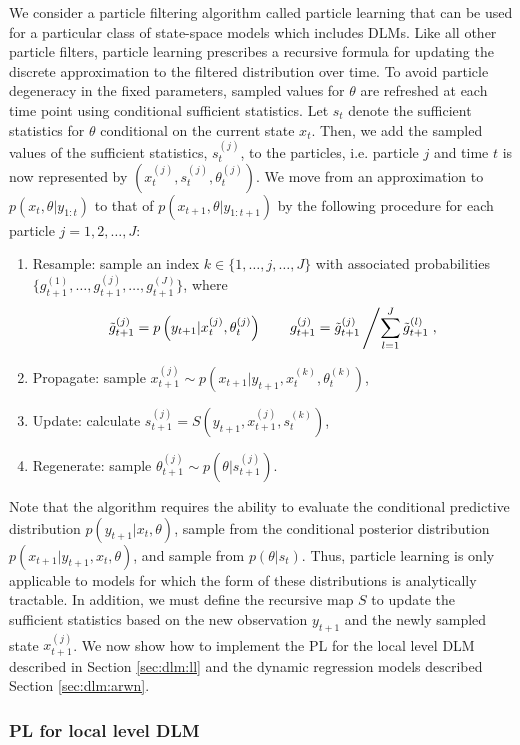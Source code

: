 We consider a particle filtering algorithm called particle learning \citep{Carv:Joha:Lope:Pols:part} that can be used for a particular class of state-space models which includes DLMs. Like all other particle filters, particle learning prescribes a recursive formula for updating the discrete approximation to the filtered distribution over time. To avoid particle degeneracy in the fixed parameters, sampled values for $\theta$ are refreshed at each time point using conditional sufficient statistics. Let $s_t$ denote the sufficient statistics for $\theta$ conditional on the current state $x_t$. Then, we add the sampled values of the sufficient statistics, $s_t^{(j)}$, to the particles, i.e. particle $j$ and time $t$ is now represented by $\left(x_t^{(j)},s_t^{(j)},\theta_t^{(j)}\right)$. We move from an approximation to $p(x_t,\theta|y_{1:t})$ to that of $p(x_{t+1},\theta|y_{1:t+1})$ by the following procedure for each particle $j = 1,2,\ldots,J$:
\begin{enumerate}
\item Resample: sample an index $k \in \{1,\ldots,j,\ldots,J\}$ with associated probabilities $\{g_{t+1}^{(1)},\ldots,g_{t+1}^{(j)},\ldots,g_{t+1}^{(J)}\}$, where \[\tilde{g}_{t+1}^{(j)} = p\left(y_{t+1}|x_t^{(j)},\theta_t^{(j)}\right) \qquad g_{t+1}^{(j)} = \tilde{g}_{t+1}^{(j)} \left/ \sum_{l=1}^J \tilde{g}_{t+1}^{(l)}\right.,\]
\item Propagate: sample $x_{t+1}^{(j)} \sim p\left(x_{t+1}|y_{t+1},x_t^{(k)},\theta_t^{(k)}\right)$,
\item Update: calculate $s_{t+1}^{(j)} = S\left(y_{t+1},x_{t+1}^{(j)},s_t^{(k)}\right)$,
\item Regenerate: sample $\theta_{t+1}^{(j)} \sim p\left(\theta|s_{t+1}^{(j)}\right)$.
\end{enumerate}
Note that the algorithm requires the ability to evaluate the conditional predictive distribution $p(y_{t+1}|x_t,\theta)$, sample from the conditional posterior distribution $p(x_{t+1}|y_{t+1},x_t,\theta)$, and sample from $p(\theta|s_t)$. Thus, particle learning is only applicable to models for which the form of these distributions is analytically tractable. In addition, we must define the recursive map $S$ to update the sufficient statistics based on the new observation $y_{t+1}$ and the newly sampled state $x_{t+1}^{(j)}$. We now show how to implement the PL for the local level DLM described in Section \ref{sec:dlm:ll} and the dynamic regression models described Section \ref{sec:dlm:arwn}.

\subsubsection{PL for local level DLM}

